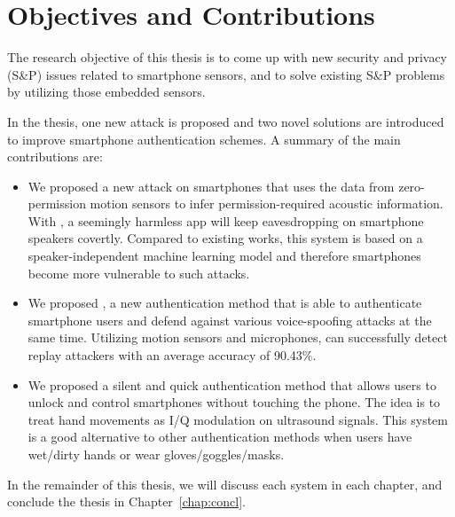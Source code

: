 {\color{blue}

\section{Objectives and Contributions}
	The research objective of this thesis is to come up with new security and privacy (S\&P) issues related to smartphone sensors, and to solve existing S\&P problems by utilizing those embedded sensors. 
	
	In the thesis, one new attack is proposed and two novel solutions are introduced to improve smartphone authentication schemes. A summary of the main  contributions are:
	\begin{itemize}
		\item We proposed a new attack on smartphones that uses the data from zero-permission motion sensors to infer permission-required acoustic information. With {\spp}, a seemingly harmless app will keep eavesdropping on smartphone speakers covertly. Compared to existing works, this {\spp} system is based on a speaker-independent machine learning model and therefore smartphones become more vulnerable to such attacks.
		
		\item We proposed {\mv}, a new authentication method that is able to authenticate smartphone users and defend against various voice-spoofing attacks at the same time. Utilizing motion sensors and microphones, {\mv} can successfully detect replay attackers with an average accuracy of 90.43\%. 
		
		\item We proposed a silent and quick authentication method {\uu} that allows users to unlock and control smartphones without touching the phone. The idea is to treat hand movements as I/Q modulation on ultrasound signals. This system is a good alternative to other authentication methods when users have wet/dirty hands or wear gloves/goggles/masks.
	\end{itemize}
 }




In the remainder of this thesis, we will discuss each system in each chapter, and conclude the thesis in Chapter~\ref{chap:concl}. 

